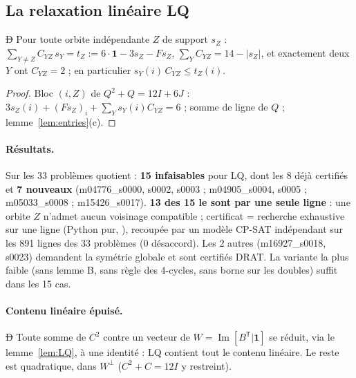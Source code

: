 \subsection{La relaxation linéaire LQ}
\begin{lemma} \st{D}\label{lem:LQ}
Pour toute orbite indépendante $Z$ de support $s_Z$ : $\sum_{Y\neq Z}C_{YZ}\,s_Y=t_Z:=6\cdot\mathbf1-3s_Z-Fs_Z$, $\sum_Y C_{YZ}=14-|s_Z|$, et exactement deux
$Y$ ont $C_{YZ}=2$ ; en particulier $s_Y(i)\,C_{YZ}\le t_Z(i)$.
\end{lemma}
\begin{proof}
Bloc $(i,Z)$ de $Q^2+Q=12I+6J$ : $3s_Z(i)+(Fs_Z)_i+\sum_Y s_Y(i)C_{YZ}=6$ ; somme de ligne de $Q$ ; lemme~\ref{lem:entries}(c).
\end{proof}
\paragraph{Résultats.} Sur les 33 problèmes quotient : \textbf{15 infaisables} pour LQ, dont les 8 déjà certifiés et \textbf{7 nouveaux}
(m04776\_s0000, s0002, s0003 ; m04905\_s0004, s0005 ; m05033\_s0008 ; m15426\_s0017). \textbf{13 des 15 le sont par une seule ligne} : une orbite $Z$ n'admet
aucun voisinage compatible ; certificat = recherche exhaustive sur une ligne (Python pur, ), recoupée par un modèle CP-SAT indépendant
sur les 891 lignes des 33 problèmes (0 désaccord). Les 2 autres (m16927\_s0018, s0023) demandent la symétrie globale et sont certifiés DRAT.
La variante la plus faible (sans lemme B, sans règle des 4-cycles, sans borne sur les doubles) suffit dans les 15 cas.

\paragraph{Contenu linéaire épuisé.} \st{D} Toute somme de $C^2$ contre un vecteur de $W=\operatorname{Im}[B^{\mathsf T}|\mathbf1]$ se réduit, via le
lemme~\ref{lem:LQ}, à une identité : LQ contient tout le contenu linéaire. Le reste est quadratique, dans $W^\perp$ ($C^2+C=12I$ y restreint).

